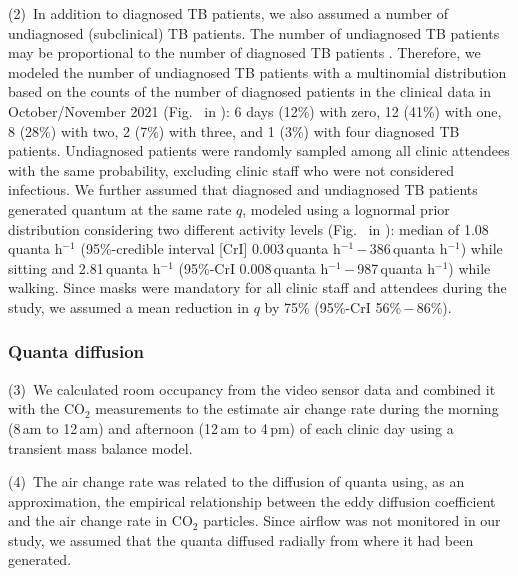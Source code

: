 \documentclass[fleqn,11pt]{wlscirep}
\begin{document}
(2)~In addition to diagnosed TB patients, we also assumed a number of undiagnosed (subclinical) TB patients. The number of undiagnosed TB patients may be proportional to the number of diagnosed TB patients \cite{Berhanu2023CID,Moyo2022LancetID,Patterson2024PNAS}. Therefore, we modeled the number of undiagnosed TB patients with a multinomial distribution based on the counts of the number of diagnosed patients in the clinical data in October/November 2021 (Fig.~ in \supp): 6 days (12\%) with zero, 12 (41\%) with one, 8 (28\%) with two, 2 (7\%) with three, and 1 (3\%) with four diagnosed TB patients. Undiagnosed patients were randomly sampled among all clinic attendees with the same probability, excluding clinic staff who were not considered infectious. We further assumed that diagnosed and undiagnosed TB patients generated quantum at the same rate $q$, modeled using a lognormal prior distribution considering two different activity levels (Fig.~ in \supp): median of 1.08\,quanta h$^{-1}$ (95\%-credible interval [CrI] 0.003\,quanta h$^{-1}$\,$-$\,386\,quanta h$^{-1}$) while sitting and 2.81\,quanta h$^{-1}$ (95\%-CrI 0.008\,quanta h$^{-1}$\,$-$\,987\,quanta h$^{-1}$) while walking\cite{Mikszewski2021GF,Buonanno2020EI,Banholzer2024PGPH}. Since masks were mandatory for all clinic staff and attendees during the study, we assumed a mean reduction in $q$ by 75\% (95\%-CrI 56\%\,$-$\,86\%)\cite{Dharmadhikari2012AJRCCM,McCreesh2021BMJGlobalHealth}.

\subsubsection*{Quanta diffusion}

(3)~We calculated  room occupancy from the video sensor data and combined it with the CO$_2$ measurements  to the estimate air change rate during the morning (8\,am to 12\,am) and afternoon (12\,am to 4\,pm) of each clinic day using a transient mass balance model\cite{Batterman2017IJERPH}. 

(4)~The air change rate was related to the diffusion of quanta using, as an approximation, the empirical relationship between the eddy diffusion coefficient and the air change rate in CO$_2$ particles\cite{Cheng2011EnvSciTech,Foat2020BE}. Since airflow was not monitored in our study, we assumed that the quanta diffused radially from where it had been generated. 
\end{document}
